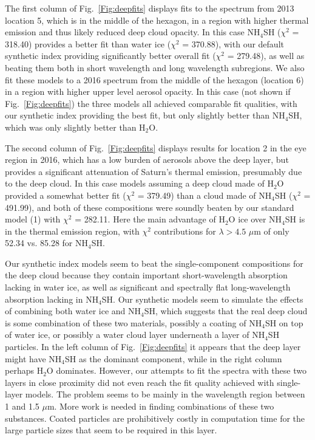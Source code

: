 \documentclass[article,11pt]{emulateapj}
\def\hto{H$_2$O }
\def\htox{H$_2$O}
\def\mum{$\mu$m }
\def\mumx{$\mu$m}
\def\chisq{$\chi^2$ }
\def\hto{H$_2$O }
\def\htox{H$_2$O}
\def\nhfsh{NH$_4$SH }
\def\nhfshx{NH$_4$SH}
\begin{document}
The first column of Fig.\ \ref{Fig:deepfits} displays fits to
the spectrum from 2013 location 5, which is in the middle of the hexagon, in a region
with higher thermal emission and thus likely reduced deep cloud opacity.  In this case
\nhfsh (\chisq = 318.40) provides a better fit than water ice  (\chisq = 370.88), with
our default synthetic index providing significantly better overall fit (\chisq = 279.48), as well
as beating them both in short wavelength and long wavelength subregions.  We also fit
these models to a 2016 spectrum from the middle of the hexagon (location 6) in a
region with higher upper level aerosol opacity. In this case (not shown if 
Fig.\ \ref{Fig:deepfits}) the three models all
achieved comparable fit qualities, with our synthetic index providing the best
fit, but only slightly better than \nhfshx, which was only slightly better than \htox.

The second column of Fig.\ \ref{Fig:deepfits} displays results for location 2 in the eye region in 2016,
which has a low burden of aerosols above the deep layer, but provides a significant
attenuation of Saturn's thermal emission, presumably due to the deep cloud.
In this case models assuming a deep cloud made of \hto provided
a somewhat better fit (\chisq = 379.49) than a cloud made of \nhfsh (\chisq = 491.99),
 and both of these compositions
were soundly beaten by our standard model (1) with \chisq = 282.11. Here the main advantage
of \hto ice over \nhfsh is in the thermal emission region, with \chisq contributions
for $\lambda > 4.5$ \mum of only 52.34 vs. 85.28 for \nhfshx. 


Our synthetic index models seem to beat the single-component compositions for the deep cloud
because they contain important short-wavelength absorption lacking in water ice, as well
as significant and spectrally flat long-wavelength absorption lacking in \nhfshx.  Our synthetic
models seem to simulate the effects of combining both water ice and \nhfshx, which suggests that
the real deep cloud is some combination of these two materials, possibly a coating of \nhfsh
on top of water ice, or possibly a water cloud layer underneath a layer of \nhfsh particles.
In the left column of Fig.\ \ref{Fig:deepfits} it appears that the deep layer might have \nhfsh as the
dominant component, while in the right column perhaps \hto dominates.
However, our attempts to fit the spectra with these two layers in close proximity did
not even reach the fit quality achieved with single-layer models.  The problem
seems to be mainly in the wavelength region between 1 and 1.5 \mumx.  More work is needed
in finding combinations of these two substances. Coated particles are prohibitively
costly in computation time for the large particle sizes that seem to be required in this layer.
\end{document}
